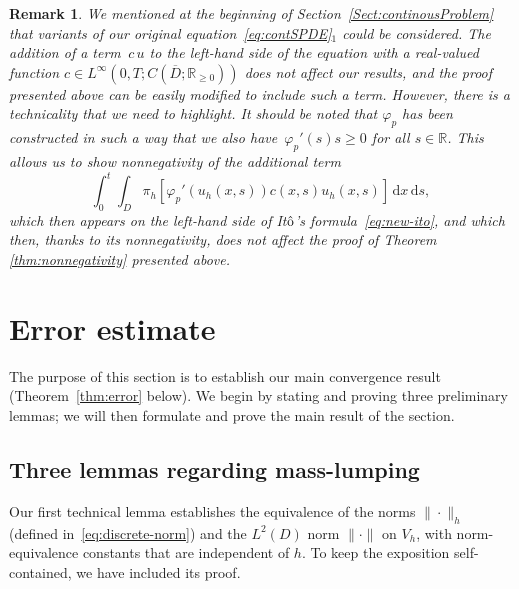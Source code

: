 \documentclass[12pt]{article}
\newtheorem{remark}{Remark}[section]
\newcommand{\dd}{\,\mathrm{d}}
\begin{document}
{\begin{remark}
We mentioned at the beginning of Section~\ref{Sect:continousProblem} that variants of our original equation~\eqref{eq:contSPDE}$_1$ could be considered. The addition of a term $\,c\,u$ to the left-hand side of the equation with a real-valued function $c \in L^\infty(0,T; C(\overline{D}; \mathbb{R}_{\geq 0}))$ does not affect our results, and the proof presented above can be easily modified to include such a term. However, there is a technicality that we need to highlight. It should be noted that $\varphi_p$ has been constructed in such a way that we also have~$\varphi_p'(s) s \geq 0$ for all $s \in \mathbb{R}$. This allows us to show nonnegativity of the additional term
%
\[\int_0^t  \int_D\pi_h[\varphi_p'(u_h(x,s)) c(x,s) u_h(x,s)]\dd x \dd s,\]
%
which then appears on the left-hand side of It$\hat{\rm{o}}$'s formula~\eqref{eq:new-ito}, and which then, thanks to its nonnegativity, does not affect the proof of Theorem \ref{thm:nonnegativity}
presented above.
\end{remark}


\section{Error estimate}\label{Section:errorEstimates}

The purpose of this section is to establish our main convergence result (Theorem~\ref{thm:error} below). 
We begin by stating and proving three preliminary lemmas; we will then formulate and prove the main result of the section.

\subsection{Three lemmas regarding mass-lumping}

Our first technical lemma establishes the equivalence of the norms $\|\cdot\|_h$ (defined in~\eqref{eq:discrete-norm}) and the $L^2(D)$ norm $\|\cdot\|$ on $V_h$, with norm-equivalence constants that are independent of $h$.
To keep the exposition self-contained, we have included its proof.

}
\end{document}
